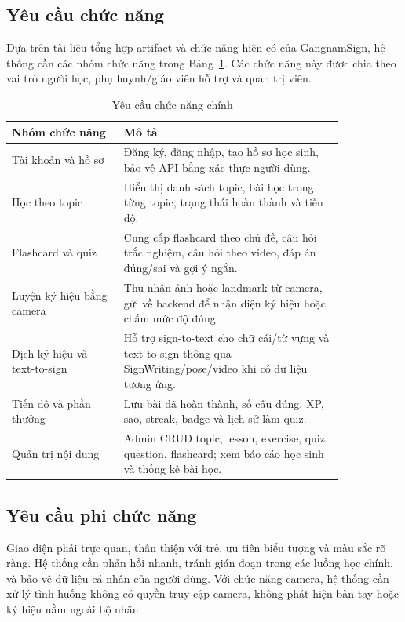 \documentclass[conference]{IEEEtran}
\begin{document}
\subsection{Yêu cầu chức năng}
Dựa trên tài liệu tổng hợp artifact và chức năng hiện có của GangnamSign, hệ thống cần các nhóm chức năng trong Bảng~\ref{tab:reqs}. Các chức năng này được chia theo vai trò người học, phụ huynh/giáo viên hỗ trợ và quản trị viên.

\begin{table}[htbp]
\caption{Yêu cầu chức năng chính}
\begin{center}
\footnotesize
\begin{tabular}{|p{0.29\linewidth}|p{0.55\linewidth}|}
\hline
\textbf{Nhóm chức năng} & \textbf{Mô tả} \\
\hline
Tài khoản và hồ sơ & Đăng ký, đăng nhập, tạo hồ sơ học sinh, bảo vệ API bằng xác thực người dùng. \\
\hline
Học theo topic & Hiển thị danh sách topic, bài học trong từng topic, trạng thái hoàn thành và tiến độ. \\
\hline
Flashcard và quiz & Cung cấp flashcard theo chủ đề, câu hỏi trắc nghiệm, câu hỏi theo video, đáp án đúng/sai và gợi ý ngắn. \\
\hline
Luyện ký hiệu bằng camera & Thu nhận ảnh hoặc landmark từ camera, gửi về backend để nhận diện ký hiệu hoặc chấm mức độ đúng. \\
\hline
Dịch ký hiệu và text-to-sign & Hỗ trợ sign-to-text cho chữ cái/từ vựng và text-to-sign thông qua SignWriting/pose/video khi có dữ liệu tương ứng. \\
\hline
Tiến độ và phần thưởng & Lưu bài đã hoàn thành, số câu đúng, XP, sao, streak, badge và lịch sử làm quiz. \\
\hline
Quản trị nội dung & Admin CRUD topic, lesson, exercise, quiz question, flashcard; xem báo cáo học sinh và thống kê bài học. \\
\hline
\end{tabular}
\label{tab:reqs}
\end{center}
\end{table}

\subsection{Yêu cầu phi chức năng}
Giao diện phải trực quan, thân thiện với trẻ, ưu tiên biểu tượng và màu sắc rõ ràng. Hệ thống cần phản hồi nhanh, tránh gián đoạn trong các luồng học chính, và bảo vệ dữ liệu cá nhân của người dùng. Với chức năng camera, hệ thống cần xử lý tình huống không có quyền truy cập camera, không phát hiện bàn tay hoặc ký hiệu nằm ngoài bộ nhãn.
\end{document}
